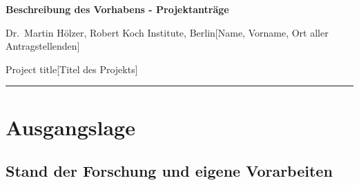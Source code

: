 \documentclass{scrartcl}
\newcommand{\applicants}{Dr.\ Martin H\"olzer, Robert Koch Institute, Berlin}
\newcommand{\project}{Project title}
\begin{document}
\pagestyle{empty}
\setcounter{page}{0}



\cleardoublepage
\pagestyle{plain}


{\raggedright{} \normalsize \bfseries 
	Beschreibung des Vorhabens - Projektanträge \par
	\applicants{[Name, Vorname, Ort aller Antragstellenden]} \par
	\project{[Titel des Projekts]} \par
	\rule{\textwidth}{0.5pt} \par
}

\section{Ausgangslage}
\label{sec:work-report}

\subsection{Stand der Forschung und eigene Vorarbeiten}
\end{document}
